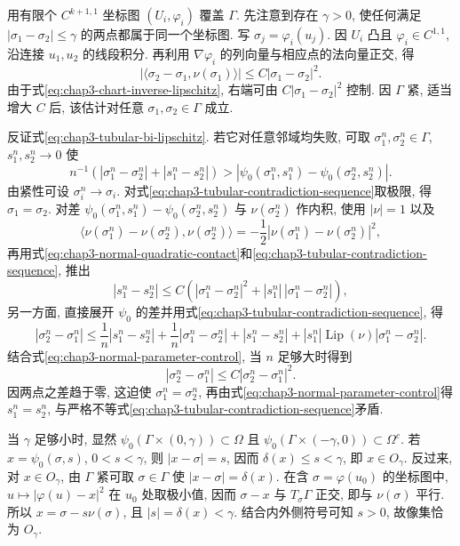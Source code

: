 \begin{Proof}
用有限个 $C^{k+1,1}$ 坐标图 $(U_i,\varphi_i)$ 覆盖 $\Gamma$. 先注意到存在 $\gamma>0$, 使任何满足 $|\sigma_1-\sigma_2|\leq\gamma$ 的两点都属于同一个坐标图. 写 $\sigma_j=\varphi_i(u_j)$. 因 $U_i$ 凸且 $\varphi_i\in C^{1,1}$, 沿连接 $u_1,u_2$ 的线段积分. 再利用 $\nabla\varphi_i$ 的列向量与相应点的法向量正交, 得
\begin{equation}
 |\langle\sigma_2-\sigma_1,\nu(\sigma_1)\rangle|
 \leq C|\sigma_1-\sigma_2|^2.
 \label{eq:chap3-normal-quadratic-contact}
\end{equation}
由于式\eqref{eq:chap3-chart-inverse-lipschitz}, 右端可由 $C|\sigma_1-\sigma_2|^2$ 控制. 因 $\Gamma$ 紧, 适当增大 $C$ 后, 该估计对任意 $\sigma_1,\sigma_2\in\Gamma$ 成立.

反证式\eqref{eq:chap3-tubular-bi-lipschitz}. 若它对任意邻域均失败, 可取 $\sigma_1^n,\sigma_2^n\in\Gamma$, $s_1^n,s_2^n\to0$ 使
\begin{equation}
 n^{-1}(|\sigma_1^n-\sigma_2^n|+|s_1^n-s_2^n|)
 >|\psi_0(\sigma_1^n,s_1^n)-\psi_0(\sigma_2^n,s_2^n)|.
 \label{eq:chap3-tubular-contradiction-sequence}
\end{equation}
由紧性可设 $\sigma_i^n\to\sigma_i$. 对式\eqref{eq:chap3-tubular-contradiction-sequence}取极限, 得 $\sigma_1=\sigma_2$. 对差 $\psi_0(\sigma_1^n,s_1^n)-\psi_0(\sigma_2^n,s_2^n)$ 与 $\nu(\sigma_2^n)$ 作内积, 使用 $|\nu|=1$ 以及
\[
 \langle\nu(\sigma_1^n)-\nu(\sigma_2^n),\nu(\sigma_2^n)\rangle
 =-\frac12|\nu(\sigma_1^n)-\nu(\sigma_2^n)|^2,
\]
再用式\eqref{eq:chap3-normal-quadratic-contact}和\eqref{eq:chap3-tubular-contradiction-sequence}, 推出
\begin{equation}
 |s_1^n-s_2^n|\leq C\left(|\sigma_1^n-\sigma_2^n|^2+
 |s_1^n|\,|\sigma_1^n-\sigma_2^n|\right),
 \label{eq:chap3-normal-parameter-control}
\end{equation}
另一方面, 直接展开 $\psi_0$ 的差并用式\eqref{eq:chap3-tubular-contradiction-sequence}, 得
\[
 |\sigma_2^n-\sigma_1^n|
 \leq\frac1n|s_1^n-s_2^n|+\frac1n|\sigma_1^n-\sigma_2^n|
 +|s_1^n-s_2^n|+|s_1^n|\operatorname{Lip}(\nu)|\sigma_1^n-\sigma_2^n|.
\]
结合式\eqref{eq:chap3-normal-parameter-control}, 当 $n$ 足够大时得到
\[
 |\sigma_2^n-\sigma_1^n|\leq C|\sigma_2^n-\sigma_1^n|^2.
\]
因两点之差趋于零, 这迫使 $\sigma_1^n=\sigma_2^n$, 再由式\eqref{eq:chap3-normal-parameter-control}得 $s_1^n=s_2^n$, 与严格不等式\eqref{eq:chap3-tubular-contradiction-sequence}矛盾.

当 $\gamma$ 足够小时, 显然 $\psi_0(\Gamma\times(0,\gamma))\subset\Omega$ 且 $\psi_0(\Gamma\times(-\gamma,0))\subset\Omega^c$. 若 $x=\psi_0(\sigma,s)$, $0<s<\gamma$, 则 $|x-\sigma|=s$, 因而 $\delta(x)\leq s<\gamma$, 即 $x\in O_\gamma$. 反过来, 对 $x\in O_\gamma$, 由 $\Gamma$ 紧可取 $\sigma\in\Gamma$ 使 $|x-\sigma|=\delta(x)$. 在含 $\sigma=\varphi(u_0)$ 的坐标图中, $u\mapsto|\varphi(u)-x|^2$ 在 $u_0$ 处取极小值, 因而 $\sigma-x$ 与 $T_\sigma\Gamma$ 正交, 即与 $\nu(\sigma)$ 平行. 所以 $x=\sigma-s\nu(\sigma)$, 且 $|s|=\delta(x)<\gamma$. 结合内外侧符号可知 $s>0$, 故像集恰为 $O_\gamma$.
\end{Proof}

